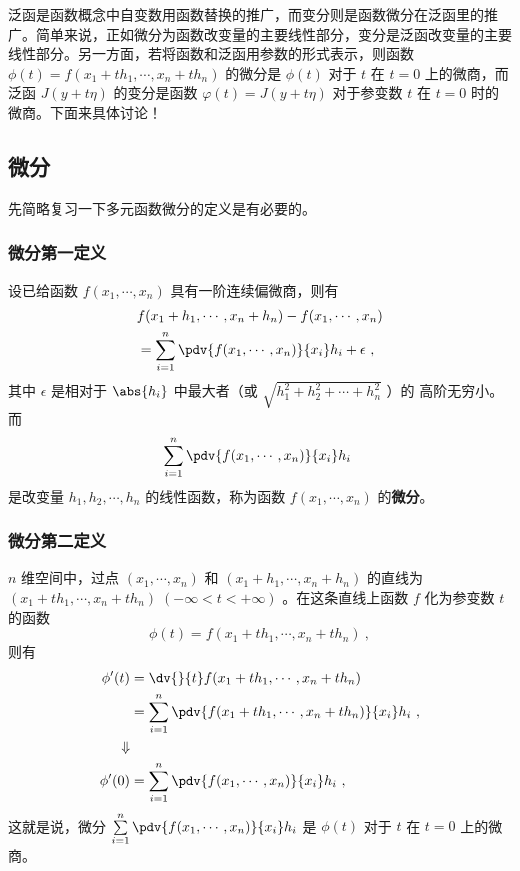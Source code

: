 
泛函是函数概念中自变数用函数替换的推广，而变分则是函数微分在泛函里的推广。简单来说，正如微分为函数改变量的主要线性部分，变分是泛函改变量的主要线性部分。另一方面，若将函数和泛函用参数的形式表示，则函数$\phi(t)=f(x_1+th_1,\cdots,x_n+th_n) $ 的微分是 $\phi(t)$ 对于 $t$ 在 $t=0$ 上的微商，而泛函 $J(y+t\eta)$ 的变分是函数 $\varphi(t)=J(y+t\eta)$ 对于参变数 $t$ 在 $t=0$ 时的微商。下面来具体讨论！
\subsection{微分}
先简略复习一下多元函数微分的定义是有必要的。
\subsubsection{微分第一定义}
设已给函数 $f(x_1,\cdots,x_n)$ 具有一阶连续偏微商，则有
\begin{equation}
\begin{aligned}
&f(x_1+h_1,\cdots,x_n+h_n)-f(x_1,\cdots,x_n)\\
&=\sum_{i=1}^{n} \pdv{f(x_1,\cdots,x_n)}{x_i}h_i+\epsilon~,
\end{aligned}
\end{equation}
其中 $\epsilon$ 是相对于 $\abs{h_i}$ 中最大者（或 $\sqrt{h_1^2+h_2^2+\cdots+h_n^2}$ ）的 高阶无穷小。而 
\begin{equation}
\sum_{i=1}^{n} \pdv{f(x_1,\cdots,x_n)}{x_i}h_i~
\end{equation}
是改变量 $h_1,h_2,\cdots,h_n$ 的线性函数，称为函数 $f(x_1,\cdots,x_n)$ 的\textbf{微分}。
\subsubsection{微分第二定义}
$n$ 维空间中，过点 $(x_1,\cdots,x_n)$ 和 $(x_1+h_1,\cdots,x_n+h_n)$ 的直线为 $(x_1+th_1,\cdots,x_n+th_n)\;(-\infty<t<+\infty)$ 。在这条直线上函数 $f$ 化为参变数 $t$ 的函数
\begin{equation}
\phi(t)=f(x_1+th_1,\cdots,x_n+th_n) ~,
\end{equation}
则有
\begin{equation}
\begin{aligned}
\phi'(t)&=\dv{}{t}f(x_1+th_1,\cdots,x_n+th_n) \\
&=\sum_{i=1}^n\pdv{f(x_1+th_1,\cdots,x_n+th_n)}{x_i}h_i~,
\\
\Downarrow
\\
\phi'(0)&=\sum_{i=1}^n\pdv{f(x_1,\cdots,x_n)}{x_i}h_i~,
\end{aligned}
\end{equation}
这就是说，微分 $\sum\limits_{i=1}^n\pdv{f(x_1,\cdots,x_n)}{x_i}h_i$ 是 $\phi(t)$ 对于 $t$ 在 $t=0$ 上的微商。
